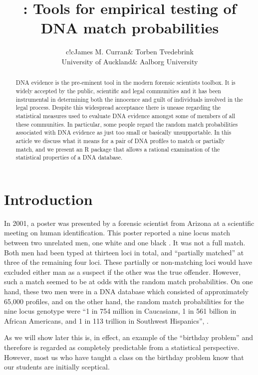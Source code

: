 \documentclass[a4paper,11pt]{article}
\author{\begin{tabular}{c!{\hspace{10mm}}c}James M. Curran& Torben Tvedebrink \\University of
  Auckland& Aalborg University\end{tabular}}
\title{\pkg{DNAtools} : Tools for empirical testing of DNA match probabilities}
\newcommand{\proglang}[1]{\textsf{#1}}
\begin{document}



\maketitle

\begin{abstract}
  DNA evidence is the pre-eminent tool in the modern forensic scientists
toolbox. It is widely accepted by the public, scientific and legal
communities and it has been instrumental in determining both the innocence
and guilt of individuals involved in the legal process. Despite this
widespread acceptance there
is unease regarding the statistical measures used to evaluate DNA
evidence amongst some of members of all these communities. In particular,
some people regard the random match probabilities associated with
DNA evidence as just too small or basically unsupportable. In this
article we discuss what it means for a pair of DNA profiles to match
or partially match, and we  present an \proglang{R} package that allows a rational
examination of the statistical properties of a DNA database.
\end{abstract}

\section[Introduction]{Introduction}
\label{sec:introduction}
In 2001, a poster was presented by a forensic scientist from Arizona
\citep{troyer2001} at a scientific meeting on human
identification. This poster reported a nine locus match between two
unrelated men, one white and one black \citep{kaye2009}.  It was not a
full match. Both men had been typed at thirteen loci in total, and
``partially matched'' at three of the remaining four loci. These
partially or non-matching loci would have excluded either man as a
suspect if the other was the true offender. However, such a match
seemed to be at odds with the random match probabilities. On one hand,
these two men were in a DNA database which consisted of approximately
65,000 profiles, and on the other hand, the random match probabilities
for the nine locus genotype were ``1 in 754 million in Caucasians, 1
in 561 billion in African Americans, and 1 in 113 trillion in
Southwest Hispanics'', \citet{troyer2001}.

As we will show later this is, in effect, an example of the ``birthday
problem'' and therefore is regarded as completely predictable from a
statistical perspective. However, most us who have taught a class on
the birthday problem know that our students are initially sceptical. 
\end{document}
